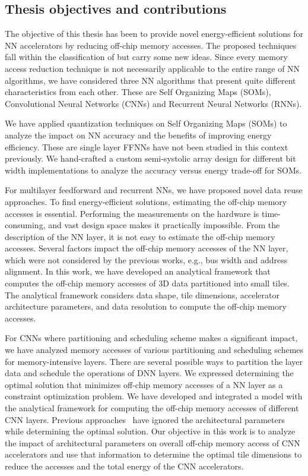 \subsection{Thesis objectives and contributions}
The objective of this thesis has been to provide novel energy-efficient solutions for NN accelerators by reducing off-chip memory accesses. The proposed techniques fall within the classification of  but carry some new ideas. Since every memory access reduction technique is not necessarily applicable to the entire range of NN algorithms, we have considered three NN algorithms that present quite different characteristics from each other. These are Self Organizing Maps (SOMs), Convolutional Neural Networks (CNNs) and Recurrent Neural Networks (RNNs).

We have applied quantization techniques on Self Organizing Maps (SOMs) to analyze the
impact on NN accuracy and the benefits of improving energy efficiency. These are single layer
FFNNs have not been studied in this context previously. We hand-crafted a custom semi-systolic array design for different bit width implementations to analyze the accuracy versus energy trade-off for SOMs. 

For multilayer feedforward and recurrent NNs, we have proposed novel data reuse approaches. To find energy-efficient solutions, estimating the off-chip memory accesses is essential. Performing the measurements on the hardware is time-consuming, and vast design space makes it practically impossible. From the description of the NN layer, it is not easy to estimate the off-chip memory accesses. Several factors impact the off-chip memory accesses of the NN layer, which were not considered by the previous works, e.g., bus width and address alignment. In this work, we have developed an analytical framework that computes the off-chip memory accesses of 3D data partitioned into small tiles. The analytical framework considers data shape, tile dimensions, accelerator architecture parameters, and data resolution to compute the off-chip memory accesses.

For CNNs where partitioning and scheduling scheme makes a significant impact, we have analyzed memory accesses of various partitioning and scheduling schemes for memory-intensive layers. There are several possible ways to partition the layer data and schedule the operations of DNN layers. We expressed determining the optimal solution that minimizes off-chip memory accesses of a NN layer as a constraint optimization problem. We have developed and integrated a model with the analytical framework for computing the off-chip memory accesses of different CNN layers. Previous approaches~\cite{zhang2015optimizing, Li2018SmartShuttleOO} have ignored the architectural parameters while determining the optimal solution. Our objective in this work is to analyze the impact of architectural parameters on overall off-chip memory access of CNN accelerators and use that information to determine the optimal tile dimensions to reduce the accesses and the total energy of the CNN accelerators.


